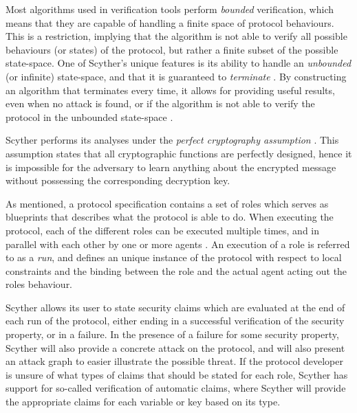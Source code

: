 Most algorithms used in verification tools perform \emph{bounded} verification, which means that they are capable of handling a finite space of protocol behaviours. This is a restriction, implying that the algorithm is not able to verify all possible behaviours (or states) of the protocol, but rather a finite subset of the possible state-space. One of Scyther's unique features is its ability to handle an \emph{unbounded} (or infinite) state-space, and that it is guaranteed to \emph{terminate} \cite{cremers2008unbounded}. By constructing an algorithm that terminates every time, it allows for providing useful results, even when no attack is found, or if the algorithm is not able to verify the protocol in the unbounded state-space \cite{cremers2008scyther}.


Scyther performs its analyses under the \emph{perfect cryptography assumption} \cite{cremers2008unbounded}. This assumption states that all cryptographic functions are perfectly designed, hence it is impossible for the adversary to learn anything about the encrypted message without possessing the corresponding decryption key.



As mentioned, a protocol specification contains a set of roles which serves as blueprints that describes what the protocol is able to do. When executing the protocol, each of the different roles can be executed multiple times, and in parallel with each other by one or more agents \cite{cremers2006scyther}. An execution of a role is referred to as a \emph{run}, and defines an unique instance of the protocol with respect to local constraints and the binding between the role and the actual agent acting out the roles behaviour.



Scyther allows its user to state security claims which are evaluated at the end of each run of the protocol, either ending in a successful verification of the security property, or in a failure. In the presence of a failure for some security property, Scyther will also provide a concrete attack on the protocol, and will also present an attack graph to easier illustrate the possible threat. If the protocol developer is unsure of what types of claims that should be stated for each role, Scyther has support for so-called verification of automatic claims, where Scyther will provide the appropriate claims for each variable or key based on its type.


